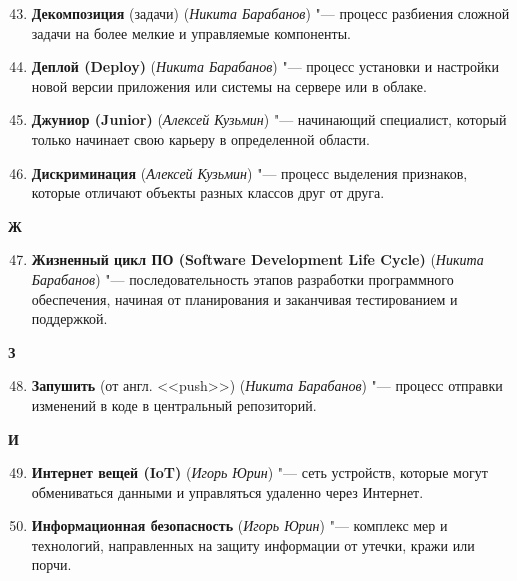 \begin{enumerate}
    \setcounter{enumi}{42}

    \item \textbf{Декомпозиция} (задачи) (\textit{Никита Барабанов}) "--- 
    процесс разбиения сложной задачи на более мелкие и управляемые компоненты.

    \item \textbf{Деплой (Deploy)} (\textit{Никита Барабанов}) "--- 
    процесс установки и настройки новой версии приложения или системы на сервере или в облаке.

    \item \textbf{Джуниор (Junior)} (\textit{Алексей Кузьмин}) "--- 
    начинающий специалист, который только начинает свою карьеру в определенной области.

    \item \textbf{Дискриминация} (\textit{Алексей Кузьмин}) "--- 
    процесс выделения признаков, которые отличают объекты разных классов друг от друга. 
\end{enumerate}

\begin{flushleft} \large\textbf{Ж} \end{flushleft}

\begin{enumerate}
    \setcounter{enumi}{46}

    \item \textbf{Жизненный цикл ПО (Software Development Life Cycle)} (\textit{Никита Барабанов}) "--- 
    последовательность этапов разработки программного обеспечения, начиная от планирования и заканчивая тестированием и поддержкой. 
\end{enumerate}

\begin{flushleft} \large\textbf{З} \end{flushleft}

\begin{enumerate}
    \setcounter{enumi}{47}

    \item \textbf{Запушить} (от англ. <<push>>) (\textit{Никита Барабанов}) "--- 
    процесс отправки изменений в коде в центральный репозиторий.
\end{enumerate}

\begin{flushleft} \large\textbf{И} \end{flushleft}

\begin{enumerate}
    \setcounter{enumi}{48}

    \item \textbf{Интернет вещей (IoT)} (\textit{Игорь Юрин}) "--- 
    сеть устройств, которые могут обмениваться данными и управляться удаленно через Интернет. 

    \item \textbf{Информационная безопасность} (\textit{Игорь Юрин}) "--- 
    комплекс мер и технологий, направленных на защиту информации от утечки, кражи или порчи.
\end{enumerate}

